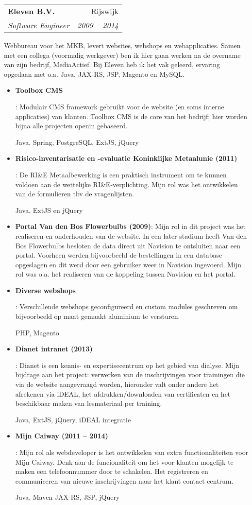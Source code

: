 \documentclass[a4paper,11pt]{article}
\makeatletter
\newcommand{\resumeItem}[2]{
  \item\small{
    \textbf{#1}{: #2 \vspace{-2pt}}
  }
}
\newcommand{\resumeSubheading}[4]{
  \vspace{-1pt}\item
    \begin{tabular*}{0.97\textwidth}[t]{l@{\extracolsep{\fill}}r}
      \textbf{#1} & #2 \\
      \textit{\small#3} & \textit{\small #4} \\
    \end{tabular*}\vspace{-2pt}
}
\newcommand{\resumeItemListStart}{\begin{itemize}}
\newcommand{\resumeItemListEnd}{\end{itemize}\vspace{-5pt}}
\makeatother
\begin{document}
    \resumeSubheading
      {Eleven B.V.}{Rijswijk}
      {Software Engineer}{2009 -- 2014}
	  \par
	  Webbureau voor het MKB, levert websites, webshops en webapplicaties. Samen met een collega 
	  (voormalig werkgever) ben ik hier gaan werken na de overname van zijn bedrijf, MediaActief.
	  Bij Eleven heb ik het vak geleerd, ervaring opgedaan met o.a. Java, JAX-RS, JSP, Magento 
	  en MySQL.
      \resumeItemListStart
        \resumeItem{Toolbox CMS}
          {Modulair CMS framework gebruikt voor de website (en soms interne applicaties) 
		  van klanten. Toolbox CMS is de core van het bedrijf; hier worden bijna alle projecten openin
		  gebaseerd.
		  \par
		  Java, Spring, PostgreSQL, ExtJS, jQuery}
        \resumeItem{Risico-inventarisatie en -evaluatie Koninklijke Metaalunie (2011)}
          {De RI\&E Metaalbewerking is een praktisch instrument om te kunnen voldoen aan
		  de wettelijke RI\&E-verplichting. Mijn rol was het ontwikkelen van de formulieren tbv de
		  vragenlijsten.
		  \par
		  Java, ExtJS en jQuery}
		\resumeItem{Portal Van den Bos Flowerbulbs (2009)}
		  {Mijn rol in dit project was het realiseren
		  en onderhouden van de website. In een later stadium heeft Van den Bos Flowerbulbs besloten
		  de data direct uit Navision te ontsluiten naar een portal. Voorheen werden bijvoorbeeld de 
		  bestellingen in een database opgeslagen en dit werd door een gebruiker weer in Navision
		  ingevoerd. Mijn rol was o.a. het realiseren van de koppeling tussen Navision en het portal.}
        \resumeItem{Diverse webshops}
          {Verschillende webshops geconfigureerd en custom modules geschreven om bijvoorbeeld op
		  maat gemaakt aluminium te versturen.
		  \par
		  PHP, Magento}
        \resumeItem{Dianet intranet (2013)}
          {Dianet is een kennis- en expertisecentrum op het gebied van dialyse. Mijn bijdrage aan het
		  project: verwerken van de inschrijvingen voor trainingen die via de website aangevraagd 
		  worden, hieronder valt onder andere het afrekenen via iDEAL, het afdrukken/downloaden 
		  van certificaten en het beschikbaar maken van lesmateriaal per training.
		  \par
		  Java, ExtJS, jQuery, iDEAL integratie}
        \resumeItem{Mijn Caiway (2011 -- 2014)}
          {Mijn rol als webdeveloper is het ontwikkelen van extra functionaliteiten voor Mijn Caiway. 
		  Denk aan de funcionaliteit om het voor klanten mogelijk te maken een telefoonnummer door te
		  schakelen. Het registreren en communiceren van nieuwe inschrijvingen naar het klant contact
		  centrum.
		  \par
		  Java, Maven JAX-RS, JSP, jQuery}
      \resumeItemListEnd
\end{document}
